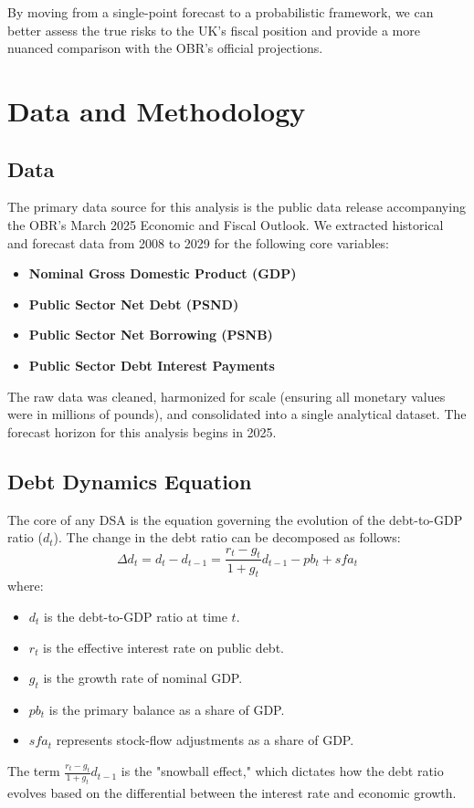 \documentclass[12pt, a4paper]{article}
\begin{document}
By moving from a single-point forecast to a probabilistic framework, we can better assess the true risks to the UK's fiscal position and provide a more nuanced comparison with the OBR's official projections.

\section{Data and Methodology}
\subsection{Data}
The primary data source for this analysis is the public data release accompanying the OBR's March 2025 Economic and Fiscal Outlook. We extracted historical and forecast data from 2008 to 2029 for the following core variables:
\begin{itemize}
    \item \textbf{Nominal Gross Domestic Product (GDP)}
    \item \textbf{Public Sector Net Debt (PSND)}
    \item \textbf{Public Sector Net Borrowing (PSNB)}
    \item \textbf{Public Sector Debt Interest Payments}
\end{itemize}
The raw data was cleaned, harmonized for scale (ensuring all monetary values were in millions of pounds), and consolidated into a single analytical dataset. The forecast horizon for this analysis begins in 2025.

\subsection{Debt Dynamics Equation}
The core of any DSA is the equation governing the evolution of the debt-to-GDP ratio ($d_t$). The change in the debt ratio can be decomposed as follows:
\begin{equation}
    \Delta d_t = d_t - d_{t-1} = \frac{r_t - g_t}{1 + g_t} d_{t-1} - pb_t + sfa_t
\end{equation}
where:
\begin{itemize}
    \item $d_t$ is the debt-to-GDP ratio at time $t$.
    \item $r_t$ is the effective interest rate on public debt.
    \item $g_t$ is the growth rate of nominal GDP.
    \item $pb_t$ is the primary balance as a share of GDP.
    \item $sfa_t$ represents stock-flow adjustments as a share of GDP.
\end{itemize}
The term $\frac{r_t - g_t}{1 + g_t} d_{t-1}$ is the "snowball effect," which dictates how the debt ratio evolves based on the differential between the interest rate and economic growth.
\end{document}
